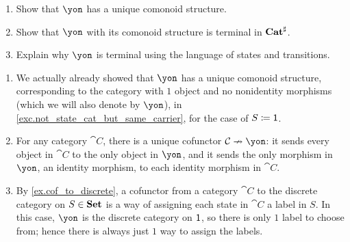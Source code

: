 \documentclass[Book-Poly]{subfiles}
\begin{document}
\begin{exercise}\label{exc.yon_comonoid}
\begin{enumerate}
	\item Show that $\yon$ has a unique comonoid structure.
	\item Show that $\yon$ with its comonoid structure is terminal in $\mathbf{Cat}^\sharp$.
	\item Explain why $\yon$ is terminal using the language of states and transitions.
\qedhere
\end{enumerate}
\begin{solution}
\begin{enumerate}
    \item We actually already showed that $\yon$ has a unique comonoid structure, corresponding to the category with $1$ object and no nonidentity morphisms (which we will also denote by $\yon$), in \cref{exc.not_state_cat_but_same_carrier}, for the case of $S\coloneqq\textsf{1}$.
    \item For any category $\cat{C}$, there is a unique cofunctor $\cat{C}\cof\yon$: it sends every object in $\cat{C}$ to the only object in $\yon$, and it sends the only morphism in $\yon$, an identity morphism, to each identity morphism in $\cat{C}$.
    \item By \cref{ex.cof_to_discrete}, a cofunctor from a category $\cat C$ to the discrete category on $S\in\mathbf{Set}$ is a way of assigning each state in $\cat C$ a label in $S$.
    In this case, $\yon$ is the discrete category on $\textsf{1}$, so there is only $1$ label to choose from; hence there is always just $1$ way to assign the labels.
\end{enumerate}
\end{solution}
\end{exercise}
\end{document}

